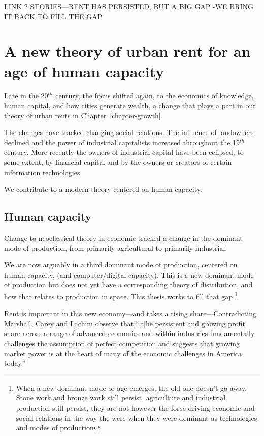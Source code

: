 LINK 2 STORIES---RENT HAS PERSISTED, BUT A BIG GAP -WE BRING IT BACK TO FILL THE GAP


\section{A new theory of urban rent for an age of human capacity}


Late in the 20$^{th}$ century, the focus shifted again, to the economics of  knowledge, human capital, and how cities generate wealth, a change that plays a part in  our theory of urban rents in Chapter~\ref{chapter-growth}. 
 
The changes have tracked changing social relations. The influence of landowners declined and the power of  industrial capitalists increased throughout the 19$^{th}$ century. More recently the owners of industrial capital have been eclipsed, to some extent, by financial capital and by the owners or creators of certain information technologies.

We contribute to a modern theory centered on human capacity.

\subsection{Human capacity}
Change to neoclassical theory in economic tracked a change in the dominant mode of production, from primarily agricultural to primarily industrial.

We are now arguably in a third dominant mode of production, centered on  human capacity, (and computer/digital capacity). This is a new dominant mode of production but does not yet have a corresponding theory of distribution, and how that relates to production in space. 
This thesis works to fill that gap.\footnote{When a new dominant mode or age emerges, the old one doesn't go away. Stone work and bronze work still persist, agriculture and industrial production still persist, they are not however the force driving economic and social relations in the way the were when they were dominant as technologies and modes of production\cite{oldworldsdon'tdie}}

Rent is important in this new economy---and takes a rising share---Contradicting Marshall, Carey and Lachim \cite{careySomethingNothingHow2019} observe that,``[t]he persistent and growing profit share across a range of advanced economies and within industries fundamentally challenges the assumption of perfect competition and suggests that growing market power is at the heart of many of the economic challenges in America today.''



